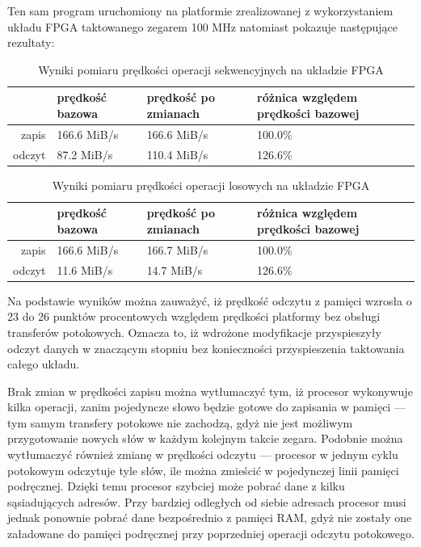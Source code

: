 Ten sam program uruchomiony na platformie zrealizowanej z wykorzystaniem układu FPGA taktowanego zegarem 100 MHz natomiast pokazuje następujące rezultaty:

\begin{table}[H]
\begin{center}
\begin{tabular}{ r|l|l|l| }
  & prędkość bazowa & prędkość po zmianach & różnica względem prędkości bazowej\\
 \hline
 zapis & 166.6 MiB/s & 166.6 MiB/s & 100.0\%\\
 odczyt & 87.2 MiB/s & 110.4 MiB/s & 126.6\%\\
 \hline
\end{tabular}
\end{center}
\caption{\label{tab:benchmark-seq-arty}Wyniki pomiaru prędkości operacji sekwencyjnych na układzie FPGA}
\end{table}

\begin{table}[H]
\begin{center}
\begin{tabular}{ r|l|l|l| }
  & prędkość bazowa & prędkość po zmianach & różnica względem prędkości bazowej\\
 \hline
 zapis & 166.6 MiB/s & 166.7 MiB/s & 100.0\%\\
 odczyt & 11.6 MiB/s & 14.7 MiB/s & 126.6\%\\
 \hline
\end{tabular}
\end{center}
\caption{\label{tab:benchmark-rnd-arty}Wyniki pomiaru prędkości operacji losowych na układzie FPGA}
\end{table}

Na podstawie wyników można zauważyć, iż prędkość odczytu z pamięci wzrosła o 23 do 26 punktów procentowych względem prędkości platformy bez obsługi transferów potokowych. Oznacza to, iż wdrożone modyfikacje przyspieszyły odczyt danych w znaczącym stopniu bez konieczności przyspieszenia taktowania całego układu.

Brak zmian w prędkości zapisu można wytłumaczyć tym, iż procesor wykonywuje kilka operacji, zanim pojedyncze słowo będzie gotowe do zapisania w pamięci --- tym samym transfery potokowe nie zachodzą, gdyż nie jest możliwym przygotowanie nowych słów w każdym kolejnym takcie zegara.
Podobnie można wytłumaczyć również zmianę w prędkości odczytu --- procesor w jednym cyklu potokowym odczytuje tyle słów, ile można zmieścić w pojedynczej linii pamięci podręcznej. Dzięki temu procesor szybciej może pobrać dane z kilku sąsiadujących adresów. Przy bardziej odległych od siebie adresach procesor musi jednak ponownie pobrać dane bezpośrednio z pamięci RAM, gdyż nie zostały one załadowane do pamięci podręcznej przy poprzedniej operacji odczytu potokowego.

